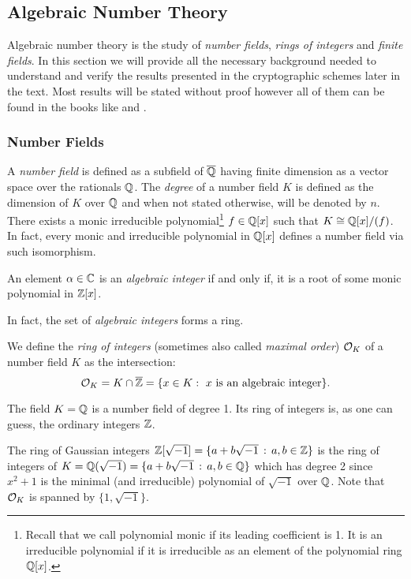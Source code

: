 \subsection{Algebraic Number Theory}\label{ant}
Algebraic number theory is the study of \textit{number fields}, \textit{rings of integers} and \textit{finite fields}. In this section we will provide all the necessary background needed to understand and verify the results presented in the cryptographic schemes later in the text. Most results will be stated without proof however all of them can be found in the books like \cite{algebra} and \cite{ribenboim}.

\subsubsection*{Number Fields}
A \textit{number field} is defined as a subfield of $\overline{\mathbb{Q}}$ having finite dimension as a vector space over the rationals $\mathbb{Q}$. The \textit{degree} of a number field $K$ is defined as the dimension of $K$ over $\mathbb{Q}$ and when not stated otherwise, will be denoted by $n$. There exists a monic irreducible polynomial\footnote{Recall that we call polynomial monic if its leading coefficient is 1. It is an irreducible polynomial if it is irreducible as an element of the polynomial ring $\mathbb{Q}[x]$.} $f \in \mathbb{Q}[x]$ such that $K \cong \mathbb{Q}[x]/(f )$. In fact, every monic and irreducible polynomial in $\mathbb{Q}[x]$ defines a number field via such isomorphism.

\begin{definition}
    An element $\alpha \in \mathbb{C}$ is an \textit{algebraic integer} if and only if, it is a root of some monic polynomial in $\mathbb{Z}[x]$.
\end{definition}
In fact, the set of \textit{algebraic integers} forms a ring.

\begin{definition}
We define the \textit{ring of integers} (sometimes also called \textit{maximal order}) $\mathcal{O}_K$ of a number field $K$ as the intersection:
$$
  \mathcal{O}_K = K \cap \overline{\mathbb{Z}} = \{x \in K : \text{ $x$ is an algebraic integer}\}.
$$
\end{definition}

\begin{example}
    The field $K = \mathbb{Q}$ is a number field of degree 1. Its ring of integers is, as one can guess, the ordinary integers $\mathbb{Z}$.
\end{example}

\begin{example}\label{z-basis}
	The ring of Gaussian integers $\mathbb{Z}[\sqrt{-1}] = \{a+b\sqrt{-1}\, : \, a,b \in \mathbb{Z} \}$ is the ring of integers of $K = \mathbb{Q}(\sqrt{-1}) = \{a + b\sqrt{-1} \, : \, a,b\in \mathbb{Q}\}$ which has degree 2 since $x^2+1$ is the minimal (and irreducible) polynomial of $\sqrt{-1}$ over $\mathbb{Q}$. Note that $\mathcal{O}_K$ is spanned by $\{1, \sqrt{-1} \}$.
\end{example}

